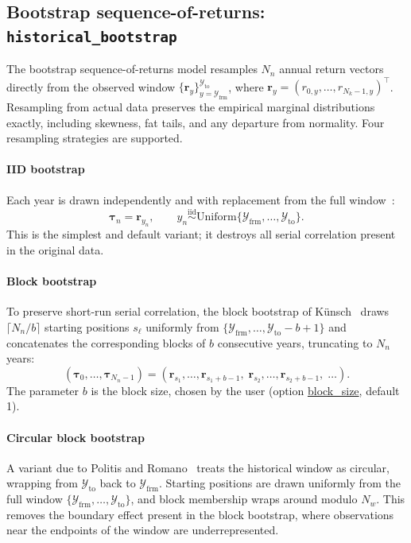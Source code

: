\documentclass[fleqn,12pt]{report}
\newcommand{\code}[1]{\url{#1}}
\begin{document}
\subsection{Bootstrap sequence-of-returns: \texttt{historical\_bootstrap}}

The bootstrap sequence-of-returns model resamples $N_n$ annual return vectors
directly from the observed window
$\{\bm{r}_y\}_{y=\mathcal{Y}_{\mathrm{frm}}}^{\mathcal{Y}_{\mathrm{to}}}$, where
$\bm{r}_y = (r_{0,y},\ldots,r_{N_k-1,y})^\top$.
Resampling from actual data preserves the empirical marginal distributions
exactly, including skewness, fat tails, and any departure from normality.
Four resampling strategies are supported.

\paragraph*{IID bootstrap}
Each year is drawn independently and with replacement from the full
window~\cite{efron1979}:
\begin{equation}
    \bm{\tau}_n = \bm{r}_{y_n},
    \qquad y_n \overset{\mathrm{iid}}{\sim}
    \mathrm{Uniform}\{\mathcal{Y}_{\mathrm{frm}}, \ldots, \mathcal{Y}_{\mathrm{to}}\}.
\end{equation}
This is the simplest and default variant; it destroys all serial correlation
present in the original data.

\paragraph*{Block bootstrap}
To preserve short-run serial correlation, the block bootstrap of
Künsch~\cite{kunsch1989} draws $\lceil N_n/b \rceil$ starting positions
$s_\ell$ uniformly from
$\{\mathcal{Y}_{\mathrm{frm}}, \ldots, \mathcal{Y}_{\mathrm{to}}-b+1\}$
and concatenates the corresponding blocks of $b$ consecutive years,
truncating to $N_n$ years:
\begin{equation}
    (\bm{\tau}_0, \ldots, \bm{\tau}_{N_n-1})
    = (\bm{r}_{s_1}, \ldots, \bm{r}_{s_1+b-1},\;
       \bm{r}_{s_2}, \ldots, \bm{r}_{s_2+b-1},\; \ldots).
\end{equation}
The parameter $b$ is the block size, chosen by the user (option \code{block_size}, default 1).

\paragraph*{Circular block bootstrap}
A variant due to Politis and Romano~\cite{politisromano1992} treats the
historical window as circular, wrapping from $\mathcal{Y}_{\mathrm{to}}$
back to $\mathcal{Y}_{\mathrm{frm}}$.
Starting positions are drawn uniformly from the full window
$\{\mathcal{Y}_{\mathrm{frm}}, \ldots, \mathcal{Y}_{\mathrm{to}}\}$,
and block membership wraps around modulo $N_w$.
This removes the boundary effect present in the block bootstrap, where
observations near the endpoints of the window are underrepresented.
\end{document}

